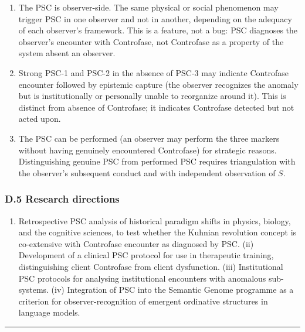 \documentclass[
  11pt,
  a4paper,
]{article}
\providecommand{\tightlist}{%
  \setlength{\itemsep}{0pt}\setlength{\parskip}{0pt}}
\begin{document}
\begin{enumerate}
\def\labelenumi{(\alph{enumi})}
\item
  The PSC is observer-side. The same physical or social phenomenon may
  trigger PSC in one observer and not in another, depending on the
  adequacy of each observer's framework. This is a feature, not a bug:
  PSC diagnoses the observer's encounter with Controfase, not Controfase
  as a property of the system absent an observer.
\item
  Strong PSC-1 and PSC-2 in the absence of PSC-3 may indicate Controfase
  encounter followed by epistemic capture (the observer recognizes the
  anomaly but is institutionally or personally unable to reorganize
  around it). This is distinct from absence of Controfase; it indicates
  Controfase detected but not acted upon.
\item
  The PSC can be performed (an observer may perform the three markers
  without having genuinely encountered Controfase) for strategic
  reasons. Distinguishing genuine PSC from performed PSC requires
  triangulation with the observer's subsequent conduct and with
  independent observation of \(S\).
\end{enumerate}

\subsubsection{D.5 Research directions}\label{d.5-research-directions}

\begin{enumerate}
\def\labelenumi{(\roman{enumi})}
\tightlist
\item
  Retrospective PSC analysis of historical paradigm shifts in physics,
  biology, and the cognitive sciences, to test whether the Kuhnian
  revolution concept is co-extensive with Controfase encounter as
  diagnosed by PSC. (ii) Development of a clinical PSC protocol for use
  in therapeutic training, distinguishing client Controfase from client
  dysfunction. (iii) Institutional PSC protocols for analysing
  institutional encounters with anomalous sub-systems. (iv) Integration
  of PSC into the Semantic Genome programme as a criterion for
  observer-recognition of emergent ordinative structures in language
  models.
\end{enumerate}

\begin{center}\rule{0.5\linewidth}{0.5pt}\end{center}
\end{document}
